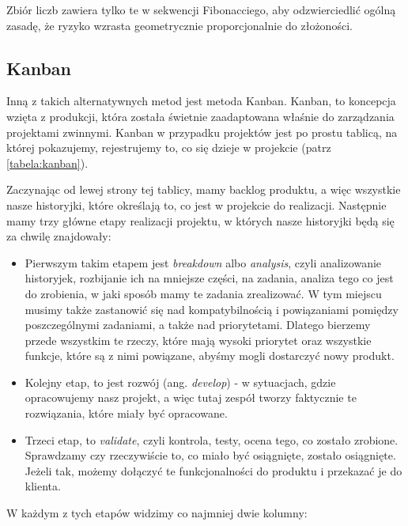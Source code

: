 Zbiór liczb zawiera tylko te w sekwencji Fibonacciego, aby odzwierciedlić ogólną zasadę,
że ryzyko wzrasta geometrycznie proporcjonalnie do złożoności.

\subsection{Kanban}

Inną z takich alternatywnych metod jest metoda Kanban. Kanban, to koncepcja wzięta z produkcji,
która została świetnie zaadaptowana właśnie do zarządzania projektami zwinnymi.
Kanban w przypadku projektów jest po prostu tablicą, na której pokazujemy,
rejestrujemy to, co się dzieje w projekcie (patrz \ref{tabela:kanban}).

Zaczynając od lewej strony tej tablicy, mamy backlog produktu, a więc wszystkie nasze historyjki,
które określają to, co jest w projekcie do realizacji.
Następnie mamy trzy główne etapy realizacji projektu, w których nasze historyjki będą się za chwilę znajdowały:

\begin{itemize}
	\item Pierwszym takim etapem jest \textit{breakdown} albo \textit{analysis}, czyli analizowanie historyjek,
	rozbijanie ich na mniejsze części, na zadania, analiza tego co jest do zrobienia, w jaki sposób mamy te zadania zrealizować.
	W tym miejscu musimy także zastanowić się nad kompatybilnością i powiązaniami pomiędzy poszczególnymi zadaniami,
	a także nad priorytetami. Dlatego bierzemy przede wszystkim te rzeczy, które mają wysoki priorytet oraz wszystkie funkcje,
	które są z nimi powiązane, abyśmy mogli dostarczyć nowy produkt.
	\item Kolejny etap, to jest rozwój (ang. \textit{develop}) - w sytuacjach, gdzie opracowujemy nasz projekt,
	a więc tutaj zespół tworzy faktycznie te rozwiązania, które miały być opracowane.
	\item Trzeci etap, to \textit{validate}, czyli kontrola, testy, ocena tego, co zostało zrobione.
	Sprawdzamy czy rzeczywiście to, co miało być osiągnięte, zostało osiągnięte.
	Jeżeli tak, możemy dołączyć te funkcjonalności do produktu i przekazać je do klienta.
\end{itemize}

W każdym z tych etapów widzimy co najmniej dwie kolumny:


